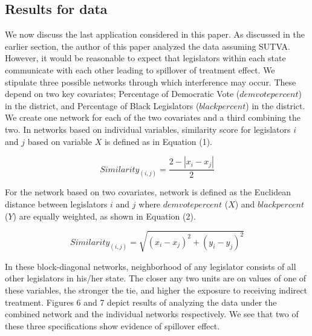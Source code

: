 \documentclass[12pt]{article}
\begin{document}
\subsection{Results for \citet{broockman2013black} data}

We now discuss the last application considered in this paper. As discussed in the earlier section, the author of this paper analyzed the data assuming SUTVA. However, it would be reasonable to expect that legislators within each state communicate with each other leading to spillover of treatment effect. We stipulate three possible networks through which interference may occur. These depend on two key covariates; Percentage of Democratic Vote ($demvotepercent$) in the district, and Percentage of Black Legislators ($blackpercent$) in the district. We create one network for each of the two covariates and a third combining the two. In networks based on individual variables, similarity score for legislators $i$ and $j$ based on variable $X$ is defined as in Equation (1).

\begin{equation}
Similarity_{(i,j)} = \frac{2 - |x_i - x_j|}{2}
\end{equation}

For the network based on two covariates, network is defined as the Euclidean distance between legislators $i$ and $j$ where $demvotepercent$ ($X$) and $blackpercent$ ($Y$) are equally weighted, as shown in Equation (2).

\begin{equation}
Similarity_{(i,j)} = \sqrt{{(x_i - x_j)}^2 + {(y_i - y_j)}^2}
\end{equation}

In these block-diagonal networks, neighborhood of any legislator consists of all other legislators in his/her state. The closer any two units are on values of one of these variables, the stronger the tie, and higher the exposure to receiving indirect treatment. Figures 6 and 7 depict results of analyzing the \citet{broockman2013black} data under the combined network and the individual networks respectively. We see that two of these three specifications show evidence of spillover effect.
\end{document}
